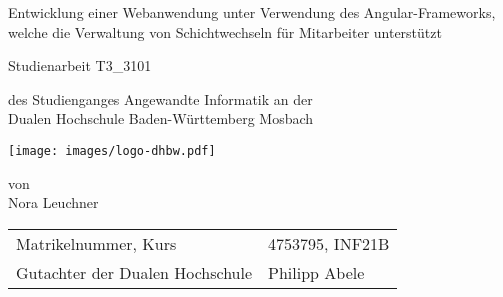 \def\doctype{Dokumententyp}
\def\title{Entwicklung einer Webanwendung unter Verwendung des Angular-Frameworks,
welche die Verwaltung von Schichtwechseln für Mitarbeiter unterstützt}
\def\author{Nora Leuchner}

\begin{titlepage}

	\vspace{5mm}

	\begin{center}
		\vspace{5mm}

		\huge \title

		\vspace{12.2pt}


		\vspace{40.6pt}

		\large Studienarbeit T3\_3101

		\vspace{40.6pt}

		\small des Studienganges Angewandte Informatik an der \\
		\large Dualen Hochschule Baden-Württemberg Mosbach

		\vspace{11.2pt}

		\texttt{[image: images/logo-dhbw.pdf]}

		\vspace{40.6pt}

		\small von \\
		\large \author
	\end{center}

	\vspace{100pt}

	\begin{table}[h]
		\centering
		\begin{tabular}{ll}
			\small Matrikelnummer, Kurs            & 4753795, INF21B \\
			\small Gutachter der Dualen Hochschule & Philipp Abele   \\
		\end{tabular}
	\end{table}

	\vspace{45.7pt}


\end{titlepage}